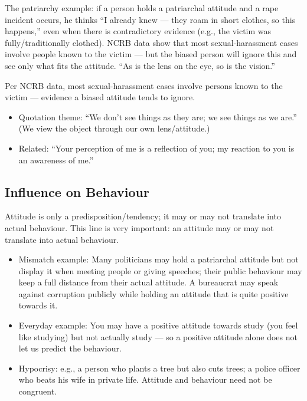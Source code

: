 The patriarchy example: if a person holds a patriarchal attitude and a rape incident occurs, he thinks ``I already knew --- they roam in short clothes, so this happens,'' even when there is contradictory evidence (e.g., the victim was fully/traditionally clothed). NCRB data show that most sexual-harassment cases involve people known to the victim --- but the biased person will ignore this and see only what fits the attitude. ``As is the lens on the eye, so is the vision.''

\begin{DataFact}
Per NCRB data, most sexual-harassment cases involve persons known to the victim --- evidence a biased attitude tends to ignore.
\end{DataFact}

\begin{PYQLink}
\begin{itemize}
\item Quotation theme: ``We don't see things as they are; we see things as we are.'' (We view the object through our own lens/attitude.)
\item Related: ``Your perception of me is a reflection of you; my reaction to you is an awareness of me.''
\end{itemize}
\end{PYQLink}

\subsection{Influence on Behaviour}

Attitude is only a predisposition/tendency; it may or may not translate into actual behaviour. This line is very important: an attitude may or may not translate into actual behaviour.

\begin{itemize}
\item Mismatch example: Many politicians may hold a patriarchal attitude but not display it when meeting people or giving speeches; their public behaviour may keep a full distance from their actual attitude. A bureaucrat may speak against corruption publicly while holding an attitude that is quite positive towards it.
\item Everyday example: You may have a positive attitude towards study (you feel like studying) but not actually study --- so a positive attitude alone does not let us predict the behaviour.
\item Hypocrisy: e.g., a person who plants a tree but also cuts trees; a police officer who beats his wife in private life. Attitude and behaviour need not be congruent.
\end{itemize}

